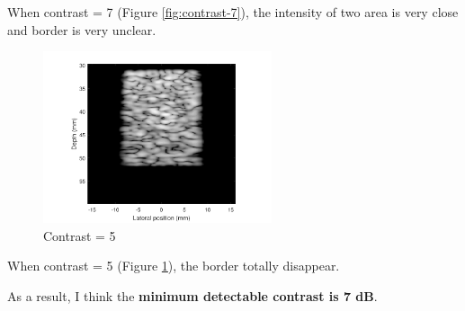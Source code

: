 \documentclass{article}
\begin{document}
When contrast = 7 (Figure \ref{fig:contrast-7}), the intensity of two area is very close and border is very unclear.
\begin{figure}[H]
	\centering
	\includegraphics[width = 0.6\textwidth]{src/contrast_5.pdf}
	\caption{Contrast = 5}
	\label{fig:contrast-5}
\end{figure}
When contrast = 5 (Figure \ref{fig:contrast-5}), the border totally disappear.

As a result, I think the \textbf{minimum detectable contrast is 7 dB}.
\end{document}
